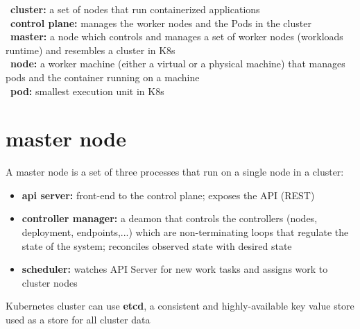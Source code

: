 \documentclass{refcard}
\begin{document}
\textbullet\ \textbf{cluster:} a set of nodes that run containerized applications\\
\textbullet\ \textbf{control plane:} manages the worker nodes and the Pods in the cluster\\
\textbullet\ \textbf{master:} a node which controls and manages a set of worker nodes (workloads runtime) and resembles a cluster in K8s\\
\textbullet\ \textbf{node:} a worker machine (either a virtual or a physical machine) that manages pods and the container running on a machine\\
\textbullet\ \textbf{pod:} smallest execution unit in K8s\\


\section{master node}

A master node is a set of three processes that run on a single node in a cluster:%
\begin{itemize}
    \item \textbf{api server:} front-end to the control plane; exposes the API (REST)%
    \item \textbf{controller manager:} a deamon that controls the controllers (nodes, deployment, endpoints,...) which are non-terminating loops that regulate the state of the system; reconciles observed state with desired state%
    \item \textbf{scheduler:} watches API Server for new work tasks and assigns work to cluster nodes
\end{itemize}
Kubernetes cluster can use \textbf{etcd}, a consistent and highly-available key value store used as a store for all cluster data
\end{document}
